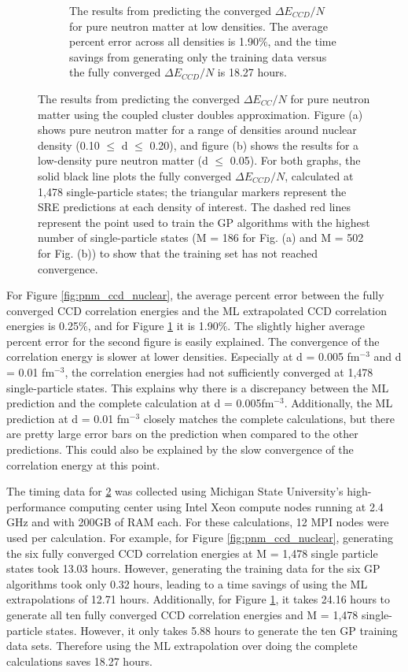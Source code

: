 \begin{figure}
\begin{subfigure}{.45\linewidth}
  \caption{The results from predicting the converged $\Delta E_{CCD}/N$ for pure neutron matter at low densities.  The average percent error across all densities is 1.90$\%$, and the time savings from generating only the training data versus the fully converged $\Delta E_{CCD}/N$ is 18.27 hours.}
  \label{fig:ornl_pnm_ccd_low}
\end{subfigure}
\caption{The results from predicting the converged $\Delta E_{CC}/N$ for pure neutron matter using the coupled cluster doubles approximation.  Figure (a) shows pure neutron matter for a range of densities around nuclear density (0.10 $\leq$ d $\leq$ 0.20), and figure (b) shows the results for a low-density pure neutron matter (d $\leq$ 0.05). For both graphs, the solid black line plots the fully converged $\Delta E_{CCD}/N$, calculated at 1,478 single-particle states; the triangular markers represent the SRE predictions at each density of interest. The dashed red lines represent the point used to train the GP algorithms with the highest number of single-particle states (M = 186 for Fig. (a) and M = 502 for Fig. (b)) to show that the training set has not reached convergence.}
\label{fig:ornl_pnm_ccd}
\end{figure}

For Figure \ref{fig:pnm_ccd_nuclear}, the average percent error between the fully converged CCD correlation energies and the ML extrapolated CCD correlation energies is 0.25$\%$, and for Figure \ref{fig:ornl_pnm_ccd_low} it is 1.90$\%$. The slightly higher average percent error for the second figure is easily explained. The convergence of the correlation energy is slower at lower densities. Especially at d = 0.005 fm$^{-3}$ and d = 0.01 fm$^{-3}$, the correlation energies had not sufficiently converged at 1,478 single-particle states. This explains why there is a discrepancy between the ML prediction and the complete calculation at d = 0.005fm$^{-3}$. Additionally, the ML prediction at d = 0.01 fm$^{-3}$ closely matches the complete calculations, but there are pretty large error bars on the prediction when compared to the other predictions. This could also be explained by the slow convergence of the correlation energy at this point.

The timing data for \ref{fig:ornl_pnm_ccd} was collected using Michigan State University's high-performance computing center using Intel Xeon compute nodes running at 2.4 GHz and with 200GB of RAM each. For these calculations, 12 MPI nodes were used per calculation. For example, for Figure \ref{fig:pnm_ccd_nuclear}, generating the six fully converged CCD correlation energies at M = 1,478 single particle states took 13.03 hours. However, generating the training data for the six GP algorithms took only 0.32 hours, leading to a time savings of using the ML extrapolations of 12.71 hours. Additionally, for Figure \ref{fig:ornl_pnm_ccd_low}, it takes 24.16 hours to generate all ten fully converged CCD correlation energies and M = 1,478 single-particle states. However, it only takes 5.88 hours to generate the ten GP training data sets. Therefore using the ML extrapolation over doing the complete calculations saves 18.27 hours.

